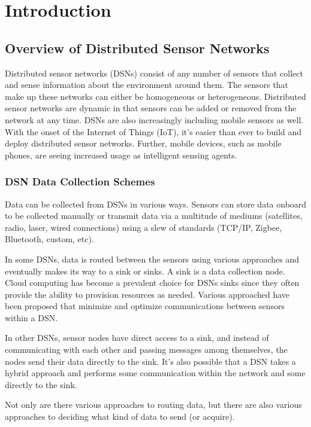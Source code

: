\chapter{Introduction}

\section{Overview of Distributed Sensor Networks}
Distributed sensor networks (DSNs) consist of any number of sensors that collect and sense information about the environment around them. The sensors that make up these networks can either be homogeneous or heterogeneous. Distributed sensor networks are dynamic in that sensors can be added or removed from the network at any time. DSNs are also increasingly including mobile sensors as well. With the onset of the Internet of Things (IoT), it’s easier than ever to build and deploy distributed sensor networks. Further, mobile devices, such as mobile phones, are seeing increased usage as intelligent sensing agents.

\subsection{DSN Data Collection Schemes}
Data can be collected from DSNs in various ways. Sensors can store data onboard to be collected manually or transmit data via a multitude of mediums (satellites, radio, laser, wired connections) using a slew of standards (TCP/IP, Zigbee, Bluetooth, custom, etc).

In some DSNs, data is routed between the sensors using various approaches %
and eventually makes its way to a sink or sinks. A sink is a data collection node. Cloud computing has become a prevalent choice for DSNs sinks since they often provide the ability to provision resources as needed. Various approached have been proposed that minimize and optimize communications between sensors within a DSN. %

In other DSNs, sensor nodes have direct access to a sink, and instead of communicating with each other and passing messages among themselves, the nodes send their data directly to the sink. It's also possible that a DSN takes a hybrid approach and performs some communication within the network and some directly to the sink. 

Not only are there various approaches to routing data, but there are also various approaches to deciding what kind of data to send (or acquire). 

